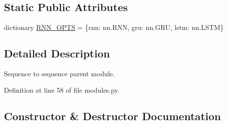 \subsection*{Static Public Attributes}
\begin{DoxyCompactItemize}
\item 
dictionary \hyperlink{classparlai_1_1agents_1_1seq2seq_1_1modules_1_1Seq2seq_a3962ff3f0654a2808f13d677c7192fa2}{R\+N\+N\+\_\+\+O\+P\+TS} = \{\textquotesingle{}rnn\textquotesingle{}\+: nn.\+R\+NN, \textquotesingle{}gru\textquotesingle{}\+: nn.\+G\+RU, \textquotesingle{}lstm\textquotesingle{}\+: nn.\+L\+S\+TM\}
\end{DoxyCompactItemize}


\subsection{Detailed Description}
\begin{DoxyVerb}Sequence to sequence parent module.\end{DoxyVerb}
 

Definition at line 58 of file modules.\+py.



\subsection{Constructor \& Destructor Documentation}
\mbox{\label{classparlai_1_1agents_1_1seq2seq_1_1modules_1_1Seq2seq_a8e8ad02405bcaf384e154a0e238fc10d}} 

